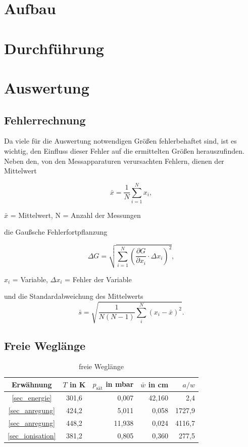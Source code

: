 \section{Aufbau}

\section{Durchführung}

\section{Auswertung}
\subsection{Fehlerrechnung}
Da viele für die Auswertung notwendigen Größen fehlerbehaftet sind, ist es wichtig, den Einfluss dieser Fehler auf die ermittelten
Größen herauszufinden. Neben den, von den Messapparaturen verursachten Fehlern, dienen der Mittelwert
\begin{formel}[H]
\begin{equation}
 \bar{x} = \frac1N \sum_{i=1}^{N} x_i,
 \label{eq_mittel}
\end{equation}
\caption*{\small{$\bar{x}$ = Mittelwert, N = Anzahl der Messungen}}
\end{formel}
die Gaußsche Fehlerfortpflanzung
\begin{formel}[H]
\begin{equation}
\Delta G = \sqrt{\sum_{i=1}^{N}\left( \frac{\partial G}{\partial x_i}\cdot \Delta x_i\right)^2},
\label{gauss}
\end{equation}
\caption*{$x_i$ = Variable, $\Delta x_i$ = Fehler der Variable}
\end{formel}
und die Standardabweichung des Mittelwerts
\begin{equation}
 \bar s = \sqrt{\frac{1}{N(N-1)} \sum_{i}^{N} (x_i - \bar{x})^2}.
 \label{eq_standard}
\end{equation}

\subsection{Freie Weglänge}

\begin{table}[H]
 \begin{tabular}{c|c|r|r|r}
  Erwähnung	&$T$ in K	&$p_{\text{sät}}$ in mbar&$\bar w$ in cm	&$a/w$ \\
  \hline
\ref{sec_energie}&	301,6	&0,007&	42,160&	2,4\\
\ref{sec_anregung}&	424,2&	5,011	&0,058&	1727,9\\
\ref{sec_anregung}&	448,2&	11,938&	0,024&	4116,7\\
\ref{sec_ionisation}&	381,2&	0,805&	0,360&	277,5
 \end{tabular}
\caption{freie Weglänge}
\label{tab_weglaenge}
\end{table}

